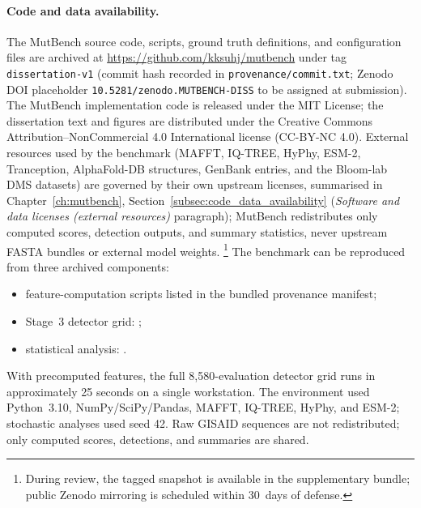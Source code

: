 \paragraph{Code and data availability.}\label{sec:code_availability}
The MutBench source code, scripts, ground truth definitions, and configuration files are archived at \url{https://github.com/kksuhj/mutbench} under tag \texttt{dissertation-v1} (commit hash recorded in \texttt{provenance/commit.txt}; Zenodo DOI placeholder \texttt{10.5281/zenodo.MUTBENCH-DISS} to be assigned at submission).
The MutBench implementation code is released under the MIT License; the dissertation text and figures are distributed under the Creative Commons Attribution--NonCommercial 4.0 International license (CC-BY-NC 4.0). External resources used by the benchmark (MAFFT, IQ-TREE, HyPhy, ESM-2, Tranception, AlphaFold-DB structures, GenBank entries, and the Bloom-lab DMS datasets) are governed by their own upstream licenses, summarised in Chapter~\ref{ch:mutbench}, Section~\ref{subsec:code_data_availability} (\emph{Software and data licenses (external resources)} paragraph); MutBench redistributes only computed scores, detection outputs, and summary statistics, never upstream FASTA bundles or external model weights.%
\footnote{During review, the tagged snapshot is available in the supplementary bundle; public Zenodo mirroring is scheduled within 30~days of defense.}
The benchmark can be reproduced from three archived components:
\begin{itemize}[leftmargin=*,itemsep=0pt]
\item feature-computation scripts listed in the bundled provenance manifest;
\item Stage~3 detector grid: ;
\item statistical analysis: .
\end{itemize}
With precomputed features, the full 8{,}580-evaluation detector grid runs in approximately 25 seconds on a single workstation.
The environment used Python~3.10, NumPy/SciPy/Pandas, MAFFT, IQ-TREE, HyPhy, and ESM-2; stochastic analyses used seed 42.
Raw GISAID sequences are not redistributed; only computed scores, detections, and summaries are shared.

